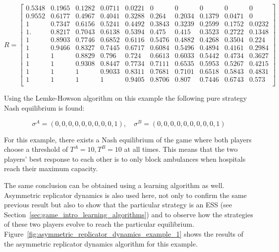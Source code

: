 \begin{equation}\label{eq:results_payoff_matrices_1}
    R = 
    \begin{bmatrix}
        0.5348 & 0.1965 & 0.1282 & 0.0711 & 0.0221 & 0      & 0      &
        0      & 0      & 0      \\
        0.9552 & 0.6177 & 0.4967 & 0.4041 & 0.3288 & 0.264  & 0.2034 &
        0.1379 & 0.0471 & 0      \\
        1      & 0.7347 & 0.6156 & 0.5241 & 0.4492 & 0.3843 & 0.3239 &
        0.2599 & 0.1752 & 0.0232 \\
        1.     & 0.8217 & 0.7043 & 0.6138 & 0.5394 & 0.475  & 0.415  &
        0.3523 & 0.2722 & 0.1348 \\
        1      & 0.8903 & 0.7746 & 0.6852 & 0.6116 & 0.5476 & 0.4882 &
        0.4268 & 0.3504 & 0.224  \\
        1      & 0.9466 & 0.8327 & 0.7445 & 0.6717 & 0.6084 & 0.5496 &
        0.4894 & 0.4161 & 0.2984 \\
        1      & 1      & 0.8829 & 0.796  & 0.724  & 0.6613 & 0.6033 &
        0.5442 & 0.4734 & 0.3627 \\
        1      & 1      & 0.9308 & 0.8447 & 0.7734 & 0.7111 & 0.6535 &
        0.5953 & 0.5267 & 0.4215 \\
        1      & 1      & 1      & 0.9033 & 0.8311 & 0.7681 & 0.7101 &
        0.6518 & 0.5843 & 0.4831 \\
        1      & 1      & 1      & 1      & 0.9405 & 0.8706 & 0.807  &
        0.7446 & 0.6743 & 0.573  \\ 
    \end{bmatrix}
\end{equation}
\normalsize

Using the Lemke-Howson algorithm on this example the following pure strategy
Nash equilibrium is found:

\begin{equation}
    \sigma^A = (0, 0, 0, 0, 0, 0, 0, 0, 0, 1), \quad
    \sigma^B = (0, 0, 0, 0, 0, 0, 0, 0, 0, 1)
\end{equation}

For this example, there exists a Nash equilibrium of the game where both 
players choose a threshold of \( T^A = 10, T^B = 10 \) at all times.
This means that the two players' best response to each other is to only block
ambulances when hospitals reach their maximum capacity.

The same conclusion can be obtained using a learning algorithm as well.
Asymmetric replicator dynamics is also used here, not only to confirm the same
previous result but also to show that the particular strategy is an ESS (see
Section~\ref{sec:game_intro_learning_algorithms}) and to observe how the
strategies of these two players evolve to reach the particular equilibrium.
Figure~\ref{fig:asymmetric_replicator_dynamics_example_1} shows the results
of the asymmetric replicator dynamics algorithm for this example.

